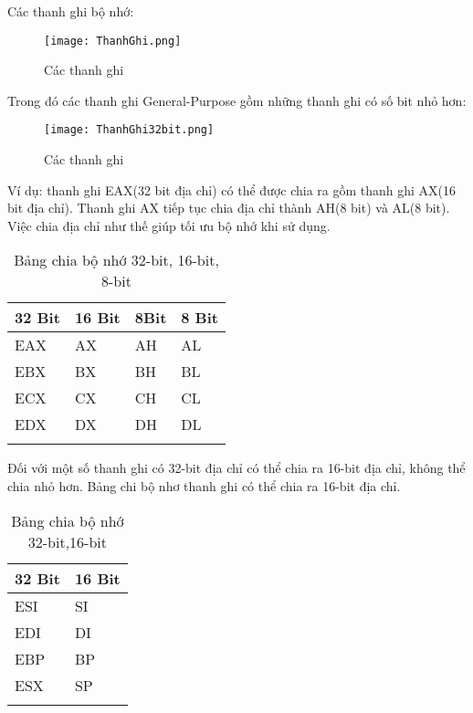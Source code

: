 		Các thanh ghi bộ nhớ:		
		\begin{center}
			\begin{figure}[htp]
				\begin{center}
					\texttt{[image: ThanhGhi.png]}
				\end{center}
				\caption{Các thanh ghi \protect\footnotemark}
				\label{fig:Flow}
			\end{figure}
		\end{center}
		
		Trong đó các thanh ghi General-Purpose gồm những thanh ghi có số bit nhỏ hơn:	
		\begin{center}
			\begin{figure}[htp]
				\begin{center}
					\texttt{[image: ThanhGhi32bit.png]}
				\end{center}
				\caption{ Các thanh ghi \protect\footnotemark}
				\label{fig:Flow}
			\end{figure}
		\end{center}
		
		Ví dụ: thanh ghi EAX(32 bit địa chỉ) có thể được chia ra gồm thanh ghi AX(16 bit địa chỉ). Thanh ghi AX tiếp tục chia địa chỉ thành AH(8 bit) và AL(8 bit). Việc chia địa chỉ như thế giúp tối ưu bộ nhớ khi sử dụng.
		\begin{longtable}{ | m{3cm} | m{3cm} | m{3cm}  | m{3cm}| }
			\hline
				32 Bit & 16 Bit & 8Bit & 8 Bit\\
			\hline
			\hline
				EAX & AX	& AH	 & AL\\
			\hline			
				EBX & BX	& BH	 & BL\\
			\hline		
				ECX & CX	& CH	 & CL\\		
			\hline
				EDX & DX	& DH	 & DL\\
			\hline
			\caption{Bảng chia bộ nhớ 32-bit, 16-bit, 8-bit}
			\label{table:tbthanhghi}
		\end{longtable}
		
			Đối với một số thanh ghi có 32-bit địa chỉ có thể chia ra 16-bit địa chỉ, không thể chia nhỏ hơn. Bảng chi bộ nhơ thanh ghi có thể chia ra 16-bit địa chỉ.\\
			\begin{longtable}{ | m{3cm} | m{3cm} | }
			\hline
				32 Bit & 16 Bit\\
			\hline
			\hline
				ESI & SI\\
			\hline			
				EDI & DI\\
			\hline		
				EBP & BP\\		
			\hline
				ESX & SP\\
			\hline
			\caption{Bảng chia bộ nhớ 32-bit,16-bit}
			\label{table:tbthanhghi}
		\end{longtable}
		
